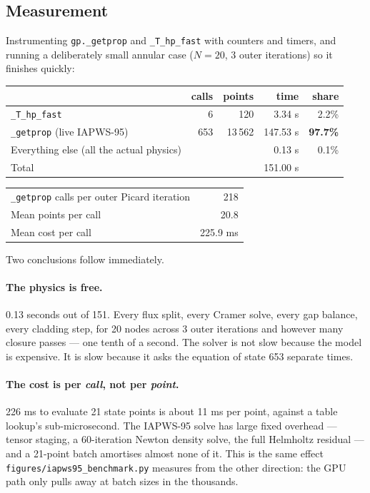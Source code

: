 \documentclass[11pt]{article}
\newcommand{\code}[1]{\texttt{#1}}
\begin{document}
\subsection{Measurement}

Instrumenting \code{gp.\_getprop} and \code{\_T\_hp\_fast} with counters and timers, and
running a deliberately small annular case ($N = 20$, 3 outer iterations) so it finishes
quickly:

\begin{center}
\begin{tabular}{lrrrr}
\toprule
 & calls & points & time & share \\
\midrule
\code{\_T\_hp\_fast} & 6 & 120 & 3.34 s & 2.2\% \\
\code{\_getprop} (live IAPWS-95) & 653 & 13\,562 & 147.53 s & \textbf{97.7\%} \\
\midrule
Everything else (all the actual physics) & & & 0.13 s & 0.1\% \\
\midrule
Total & & & 151.00 s & \\
\bottomrule
\end{tabular}
\end{center}

\begin{center}
\begin{tabular}{lr}
\toprule
\code{\_getprop} calls per outer Picard iteration & 218 \\
Mean points per call & 20.8 \\
Mean cost per call & 225.9 ms \\
\bottomrule
\end{tabular}
\end{center}

Two conclusions follow immediately.

\paragraph{The physics is free.} 0.13 seconds out of 151. Every flux split, every Cramer
solve, every gap balance, every cladding step, for 20 nodes across 3 outer iterations and
however many closure passes --- one tenth of a second. The solver is not slow because the
model is expensive. It is slow because it asks the equation of state 653 separate times.

\paragraph{The cost is per \emph{call}, not per \emph{point}.} 226 ms to evaluate 21
state points is about 11 ms per point, against a table lookup's sub-microsecond. The
IAPWS-95 solve has large fixed overhead --- tensor staging, a 60-iteration Newton density
solve, the full Helmholtz residual --- and a 21-point batch amortises almost none of it.
This is the same effect \code{figures/iapws95\_benchmark.py} measures from the other
direction: the GPU path only pulls away at batch sizes in the thousands.
\end{document}
